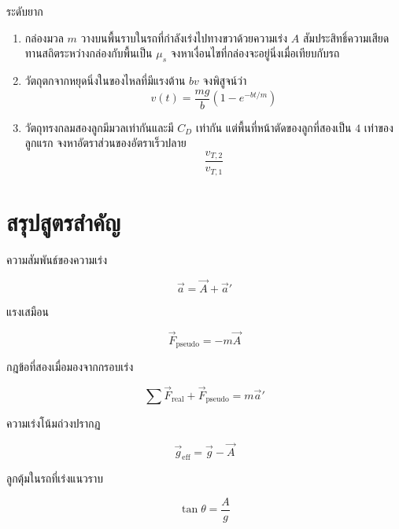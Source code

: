 \begin{exercisebox}{ระดับยาก}
\begin{enumerate}
    \item กล่องมวล $m$ วางบนพื้นราบในรถที่กำลังเร่งไปทางขวาด้วยความเร่ง $A$
    สัมประสิทธิ์ความเสียดทานสถิตระหว่างกล่องกับพื้นเป็น $\mu_s$
    จงหาเงื่อนไขที่กล่องจะอยู่นิ่งเมื่อเทียบกับรถ

    \item วัตถุตกจากหยุดนิ่งในของไหลที่มีแรงต้าน $bv$
    จงพิสูจน์ว่า
    \[
    v(t)=\frac{mg}{b}
    \left(1-e^{-bt/m}\right)
    \]

    \item วัตถุทรงกลมสองลูกมีมวลเท่ากันและมี
    $C_D$ เท่ากัน แต่พื้นที่หน้าตัดของลูกที่สองเป็น
    $4$ เท่าของลูกแรก จงหาอัตราส่วนของอัตราเร็วปลาย
    \[
    \frac{v_{T,2}}{v_{T,1}}
    \]
\end{enumerate}
\end{exercisebox}

\section{สรุปสูตรสำคัญ}

\begin{tcolorbox}[title=สรุปกรอบอ้างอิงเร่ง]
ความสัมพันธ์ของความเร่ง

\[
\vec a=\vec A+\vec a'
\]

แรงเสมือน

\[
\boxed{
\vec F_{\text{pseudo}}=-m\vec A
}
\]

กฎข้อที่สองเมื่อมองจากกรอบเร่ง

\[
\boxed{
\sum\vec F_{\text{real}}
+
\vec F_{\text{pseudo}}
=
m\vec a'
}
\]

ความเร่งโน้มถ่วงปรากฏ

\[
\boxed{
\vec g_{\text{eff}}=\vec g-\vec A
}
\]

ลูกตุ้มในรถที่เร่งแนวราบ

\[
\boxed{
\tan\theta=\frac{A}{g}
}
\]
\end{tcolorbox}

